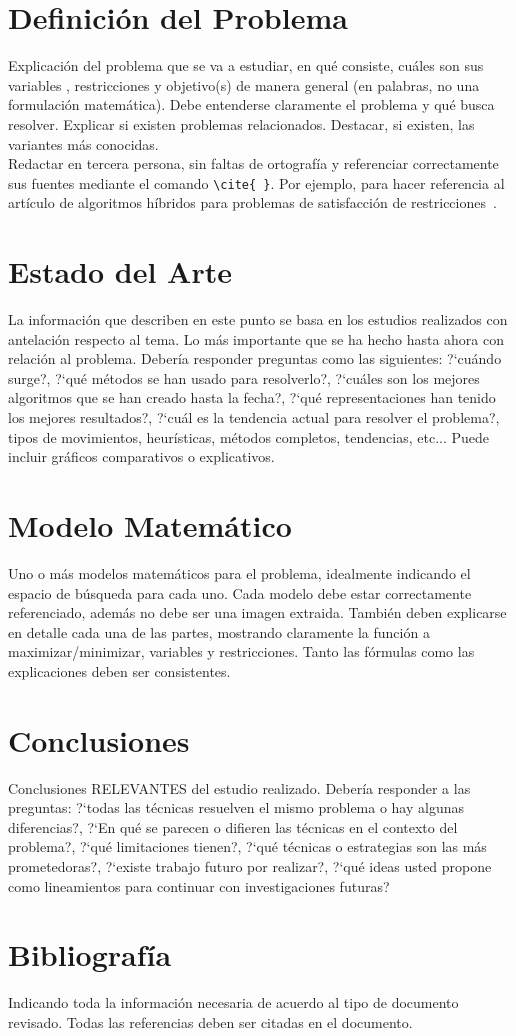 \documentclass[letter, 10pt]{article}
\begin{document}
\section{Definici\'on del Problema}
Explicaci\'on del problema que se va a estudiar, en qu\'e consiste, cu\'ales son sus variables , restricciones y objetivo(s) de manera general (en palabras, no una formulaci\'on matem\'atica). Debe entenderse claramente el problema y qu\'e busca resolver.
Explicar si existen problemas relacionados.
Destacar, si existen, las variantes m\'as conocidas.\\
Redactar en tercera persona, sin faltas de ortograf\'ia y referenciar correctamente sus fuentes mediante el comando  \verb+\cite{ }+. Por ejemplo, para hacer referencia al art\'iculo de algoritmos h\'ibridos para problemas de satisfacci\'on 
 de restricciones~\cite{Prosser93Hybrid}.

\section{Estado del Arte}
La informaci\'on que describen en este punto se basa en los estudios realizados con antelaci\'on respecto al tema.
Lo m\'as importante que se ha hecho hasta ahora con relaci\'on al problema. Deber\'ia responder preguntas como las siguientes:
?`cu\'ando surge?, ?`qu\'e m\'etodos se han usado para resolverlo?, ?`cu\'ales son los mejores algoritmos que se han creado hasta
la fecha?, ?`qu\'e representaciones han tenido los mejores resultados?, ?`cu\'al es la tendencia actual para resolver el problema?, tipos de movimientos, heur\'isticas, m\'etodos completos, tendencias, etc... Puede incluir gr\'aficos comparativos o explicativos.\\



\section{Modelo Matem\'atico}
Uno o m\'as modelos matem\'aticos para el problema, idealmente indicando el espacio de b\'usqueda para cada uno. Cada modelo debe estar correctamente referenciado, adem\'as no debe ser una imagen extraida. Tambi\'en deben explicarse en detalle cada una de las partes, mostrando claramente la funci\'on a maximizar/minimizar, variables y restricciones. Tanto las f\'ormulas como las explicaciones deben ser consistentes.

\section{Conclusiones}
Conclusiones RELEVANTES del estudio realizado. Deber\'ia responder a las preguntas: ?`todas las t\'ecnicas resuelven el mismo problema o hay algunas diferencias?, ?`En qu\'e se parecen o difieren las t\'ecnicas en el contexto del problema?, ?`qu\'e limitaciones tienen?, ?`qu\'e t\'ecnicas o estrategias son las m\'as prometedoras?, ?`existe trabajo futuro por realizar?, ?`qu\'e ideas usted propone como lineamientos para continuar con investigaciones futuras?


\section{Bibliograf\'ia}
Indicando toda la informaci\'on necesaria de acuerdo al tipo de documento revisado. Todas las referencias deben ser citadas en el documento.


\end{document}
